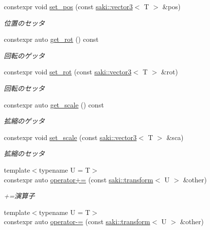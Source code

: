 \begin{DoxyCompactItemize}
constexpr void \mbox{\hyperlink{classsaki_1_1transform_a11a56e02fe536c08b55655d70548876f}{set\+\_\+pos}} (const \mbox{\hyperlink{classsaki_1_1vector3}{saki\+::vector3}}$<$ T $>$ \&pos)
\begin{DoxyCompactList}\small\item\em 位置のセッタ \end{DoxyCompactList}\item 
constexpr auto \mbox{\hyperlink{classsaki_1_1transform_ad0b5e29b9f201f3fcb34011a146a89c1}{get\+\_\+rot}} () const
\begin{DoxyCompactList}\small\item\em 回転のゲッタ \end{DoxyCompactList}\item 
constexpr void \mbox{\hyperlink{classsaki_1_1transform_a0920b584e25129a5b0d42dbc296abd55}{set\+\_\+rot}} (const \mbox{\hyperlink{classsaki_1_1vector3}{saki\+::vector3}}$<$ T $>$ \&rot)
\begin{DoxyCompactList}\small\item\em 回転のセッタ \end{DoxyCompactList}\item 
constexpr auto \mbox{\hyperlink{classsaki_1_1transform_a8d7e5a36cc869a8b43ee779d90074279}{get\+\_\+scale}} () const
\begin{DoxyCompactList}\small\item\em 拡縮のゲッタ \end{DoxyCompactList}\item 
constexpr void \mbox{\hyperlink{classsaki_1_1transform_ad1423bce28426ae4b739ccb22bc0fd5d}{set\+\_\+scale}} (const \mbox{\hyperlink{classsaki_1_1vector3}{saki\+::vector3}}$<$ T $>$ \&sca)
\begin{DoxyCompactList}\small\item\em 拡縮のセッタ \end{DoxyCompactList}\item 
{\footnotesize template$<$typename U  = T$>$ }\\constexpr auto \mbox{\hyperlink{classsaki_1_1transform_a6478b00898341e47040560a01f0b9cbc}{operator+=}} (const \mbox{\hyperlink{classsaki_1_1transform}{saki\+::transform}}$<$ U $>$ \&other)
\begin{DoxyCompactList}\small\item\em +=演算子 \end{DoxyCompactList}\item 
{\footnotesize template$<$typename U  = T$>$ }\\constexpr auto \mbox{\hyperlink{classsaki_1_1transform_a4ce71c92d3d4944f6773a021d0bd3234}{operator-\/=}} (const \mbox{\hyperlink{classsaki_1_1transform}{saki\+::transform}}$<$ U $>$ \&other)

\end{DoxyCompactItemize}
